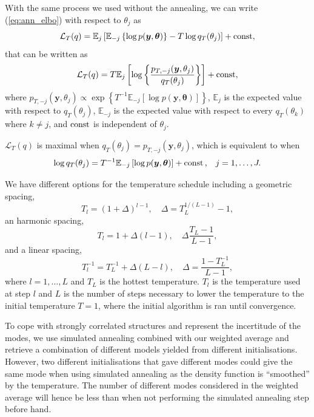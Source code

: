 \documentclass[a4paper, 11pt]{report}
\numberwithin{equation}{chapter}
\DeclareMathOperator*{\const}{{\rm const}}
\begin{document}
With the same process we used without the annealing, we can write (\ref{eq:ann_elbo}) with respect to $\theta_j$ as
\begin{equation*}
\mathcal{L}_T(q) = \mathbb{E}_j\left[\mathbb{E}_{-j}\left\lbrace \log p(\boldsymbol{y},\boldsymbol{\theta})\right\rbrace - T \log q_T(\theta_j)\right]+ \const,
\end{equation*}
that can be written as
\begin{equation*}
\mathcal{L}_T(q) = T\mathbb{E}_j\left[\log\left\lbrace\frac{p_{T, -j}(\boldsymbol{y}, \theta_j)}{q_T(\theta_j)}\right\rbrace\right] + \const,	
\end{equation*}
where $p_{T, -j}(\boldsymbol{y},\theta_j) \propto \exp\left\lbrace T^{-1}\mathbb{E}_{-j}\left[\log p(\boldsymbol{y},\boldsymbol{\theta})\right]\right\rbrace$, $\mathbb{E}_j$ is the expected value with respect to $q_T(\theta_j)$, $\mathbb{E}_{-j}$ is the expected value with respect to every $ q_T(\theta_k)$ where $k \neq j$, and $\const$ is independent of $\theta_j$.

$\mathcal{L}_T(q)$ is maximal when $q_T(\theta_j) = p_{T,-j}(\boldsymbol{y},\theta_j)$, which is equivalent to when
\begin{equation*}
\log q_T(\theta_j) = T^{-1} \mathbb{E}_{-j}\left[\log p(\boldsymbol{y}, \boldsymbol{\theta})\right] + \const\text{,}\quad j=1,\dots,J.
\end{equation*}

We have different options for the temperature schedule including a geometric spacing,
\begin{equation*}
T_l = (1 + \Delta)^{l-1},\quad \Delta = T_L^{1/(L-1)}-1,
\end{equation*}
an harmonic spacing,
\begin{equation*}
T_l = 1 + \Delta(l-1), \quad \Delta \frac{T_L-1}{L-1},
\end{equation*}
and a linear spacing,
\begin{equation*}
T_l^{-1} = T_L^{-1} + \Delta (L-l), \quad \Delta = \frac{1-T_L^{-1}}{L-1},
\end{equation*}
where $l = 1,\dots,L$ and $T_L$ is the hottest temperature. $T_l$ is the temperature used at step $l$ and $L$ is the number of steps necessary to lower the temperature to the initial temperature $T = 1$, where the initial algorithm is ran until convergence.

To cope with strongly correlated structures and represent the incertitude of the modes, we use simulated annealing combined with our weighted average and retrieve a combination of different models yielded from different initialisations. However, two different initialisations that gave different modes could give the same mode when using simulated annealing as the density function is ``smoothed'' by the temperature. The number of different modes considered in the weighted average will hence be less than when not performing the simulated annealing step before hand.
\end{document}
